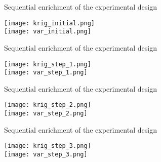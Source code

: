 \documentclass[9pt]{beamer}
\begin{document}

\begin{frame}{Sequential enrichment of the experimental design}

\begin{center}
\texttt{[image: krig\_initial.png]}\\
\texttt{[image: var\_initial.png]}
\end{center}

\end{frame}


\begin{frame}{Sequential enrichment of the experimental design}

\begin{center}
\texttt{[image: krig\_step\_1.png]}\\
\texttt{[image: var\_step\_1.png]}
\end{center}

\end{frame}


\begin{frame}{Sequential enrichment of the experimental design}

\begin{center}
\texttt{[image: krig\_step\_2.png]}\\
\texttt{[image: var\_step\_2.png]}
\end{center}

\end{frame}


\begin{frame}{Sequential enrichment of the experimental design}

\begin{center}
\texttt{[image: krig\_step\_3.png]}\\
\texttt{[image: var\_step\_3.png]}
\end{center}

\end{frame}
\end{document}
